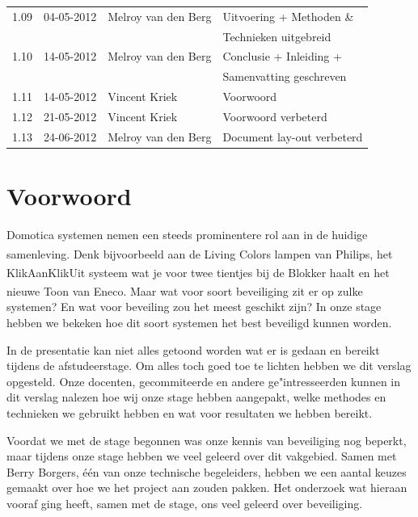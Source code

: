 \documentclass[]{article}
\begin{document}
\begin{tabular}{|| l | l | l | l ||}
    1.09    &04-05-2012  &Melroy van den Berg &Uitvoering + Methoden \&        \\ 
            &            &                    &Technieken uitgebreid           \\\hline
    1.10    &14-05-2012  &Melroy van den Berg &Conclusie + Inleiding +         \\
            &            &                    &Samenvatting geschreven         \\\hline 
    1.11    &14-05-2012  &Vincent Kriek       &Voorwoord                       \\\hline
    1.12    &21-05-2012  &Vincent Kriek       &Voorwoord verbeterd             \\\hline
    1.13    &24-06-2012  &Melroy van den Berg &Document lay-out verbeterd      \\\hline
\end{tabular}

\newpage
\section*{Voorwoord}
Domotica systemen nemen een steeds prominentere rol aan in de huidige
samenleving. Denk bijvoorbeeld aan de Living Colors lampen van
Philips\textsuperscript{\texttrademark}, het
KlikAanKlikUit\textsuperscript{\textregistered} systeem wat je voor twee tientjes bij de Blokker haalt en het
nieuwe Toon\textsuperscript{\textregistered} van Eneco. Maar wat voor soort beveiliging zit er op zulke systemen?
En wat voor beveiling zou het meest geschikt zijn? In onze stage hebben we bekeken
hoe dit soort systemen het best beveiligd kunnen worden.

In de presentatie kan niet alles getoond worden wat er is gedaan en bereikt
tijdens de afstudeerstage. Om alles toch goed toe te lichten hebben we dit
verslag opgesteld.  Onze docenten, gecommiteerde en andere ge"intresseerden
kunnen in dit verslag nalezen hoe wij onze stage hebben aangepakt, welke
methodes en technieken we gebruikt hebben en wat voor resultaten we hebben
bereikt.

Voordat we met de stage begonnen was onze kennis van beveiliging nog beperkt,
maar tijdens onze stage hebben we veel geleerd over dit vakgebied. Samen met
Berry Borgers, \'e\'en van onze technische begeleiders, hebben we een aantal keuzes
gemaakt over hoe we het project aan zouden pakken. Het onderzoek wat hieraan
vooraf ging heeft, samen met de stage, ons veel geleerd over beveiliging.
\end{document}
